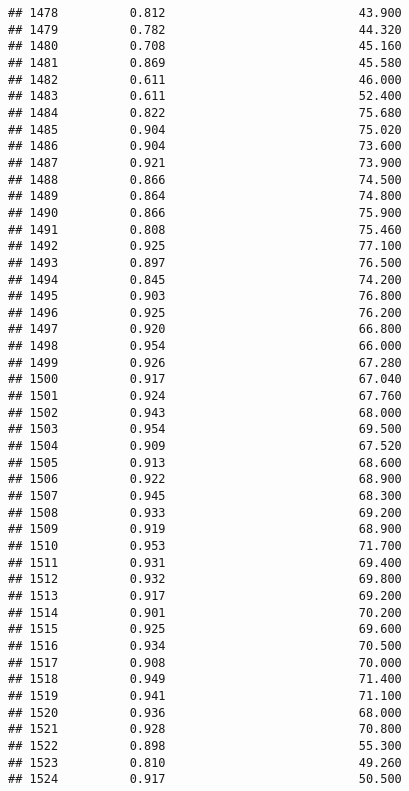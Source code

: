 \documentclass[
]{article}
\begin{document}
\begin{verbatim}
## 1478          0.812                           43.900
## 1479          0.782                           44.320
## 1480          0.708                           45.160
## 1481          0.869                           45.580
## 1482          0.611                           46.000
## 1483          0.611                           52.400
## 1484          0.822                           75.680
## 1485          0.904                           75.020
## 1486          0.904                           73.600
## 1487          0.921                           73.900
## 1488          0.866                           74.500
## 1489          0.864                           74.800
## 1490          0.866                           75.900
## 1491          0.808                           75.460
## 1492          0.925                           77.100
## 1493          0.897                           76.500
## 1494          0.845                           74.200
## 1495          0.903                           76.800
## 1496          0.925                           76.200
## 1497          0.920                           66.800
## 1498          0.954                           66.000
## 1499          0.926                           67.280
## 1500          0.917                           67.040
## 1501          0.924                           67.760
## 1502          0.943                           68.000
## 1503          0.954                           69.500
## 1504          0.909                           67.520
## 1505          0.913                           68.600
## 1506          0.922                           68.900
## 1507          0.945                           68.300
## 1508          0.933                           69.200
## 1509          0.919                           68.900
## 1510          0.953                           71.700
## 1511          0.931                           69.400
## 1512          0.932                           69.800
## 1513          0.917                           69.200
## 1514          0.901                           70.200
## 1515          0.925                           69.600
## 1516          0.934                           70.500
## 1517          0.908                           70.000
## 1518          0.949                           71.400
## 1519          0.941                           71.100
## 1520          0.936                           68.000
## 1521          0.928                           70.800
## 1522          0.898                           55.300
## 1523          0.810                           49.260
## 1524          0.917                           50.500

\end{verbatim}
\end{document}
